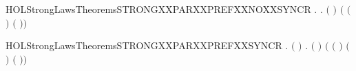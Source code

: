 \begin{SaveVerbatim}{HOLStrongLawsTheoremsSTRONGXXPARXXPREFXXNOXXSYNCR}
\HOLTokenTurnstile{} \HOLSymConst{\HOLTokenForall{}} .
        \HOLSymConst{\HOLTokenNotEqual{}}   \HOLSymConst{\HOLTokenImp{}}
       \HOLSymConst{\HOLTokenForall{}} .
            \ensuremath{(} \HOLSymConst{\ensuremath{\ldotp}} \HOLSymConst{\ensuremath{\mid}}  \HOLSymConst{\ensuremath{\ldotp}}\ensuremath{)}
             \ensuremath{(} \HOLSymConst{\ensuremath{\ldotp}}\ensuremath{(} \HOLSymConst{\ensuremath{\mid}}  \HOLSymConst{\ensuremath{\ldotp}}\ensuremath{)} \HOLSymConst{\ensuremath{+}}
               \HOLSymConst{\ensuremath{\ldotp}}\ensuremath{(} \HOLSymConst{\ensuremath{\ldotp}} \HOLSymConst{\ensuremath{\mid}} \ensuremath{)}\ensuremath{)}
\end{SaveVerbatim}
\newcommand{\HOLStrongLawsTheoremsSTRONGXXPARXXPREFXXNOXXSYNCR}{\UseVerbatim{HOLStrongLawsTheoremsSTRONGXXPARXXPREFXXNOXXSYNCR}}
\begin{SaveVerbatim}{HOLStrongLawsTheoremsSTRONGXXPARXXPREFXXSYNCR}
\HOLTokenTurnstile{} \HOLSymConst{\HOLTokenForall{}} .
       \ensuremath{(} \HOLSymConst{\ensuremath{=}}  \ensuremath{)} \HOLSymConst{\HOLTokenImp{}}
       \HOLSymConst{\HOLTokenForall{}} .
            \ensuremath{(} \HOLSymConst{\ensuremath{\ldotp}} \HOLSymConst{\ensuremath{\mid}}  \HOLSymConst{\ensuremath{\ldotp}}\ensuremath{)}
             \ensuremath{(} \HOLSymConst{\ensuremath{\ldotp}}\ensuremath{(} \HOLSymConst{\ensuremath{\mid}}  \HOLSymConst{\ensuremath{\ldotp}}\ensuremath{)} \HOLSymConst{\ensuremath{+}}
               \HOLSymConst{\ensuremath{\ldotp}}\ensuremath{(} \HOLSymConst{\ensuremath{\ldotp}} \HOLSymConst{\ensuremath{\mid}} \ensuremath{)} \HOLSymConst{\ensuremath{+}} \HOLConst{\ensuremath{\tau}}\HOLSymConst{\ensuremath{\ldotp}}\ensuremath{(} \HOLSymConst{\ensuremath{\mid}} \ensuremath{)}\ensuremath{)}
\end{SaveVerbatim}
